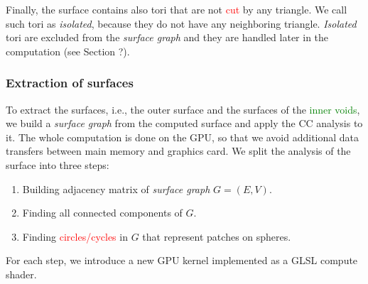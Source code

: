 Finally, the surface contains also tori that are not \textcolor{red}{cut} by any triangle.
We call such tori as \textit{isolated}, because they do not have any neighboring triangle.
\textit{Isolated} tori are excluded from the \textit{surface graph} and they are handled later in the computation (see Section ?).

\subsubsection{Extraction of surfaces}

To extract the surfaces, i.e., the outer surface and the surfaces of the \textcolor{green}{inner voids}, we build a \textit{surface graph} from the computed surface and apply the CC analysis to it.
The whole computation is done on the GPU, so that we avoid additional data transfers between main memory and graphics card.
We split the analysis of the surface into three steps:
\begin{enumerate}
  \item Building adjacency matrix of \textit{surface graph} $G = (E, V)$.
	\item Finding all connected components of $G$.
	\item Finding \textcolor{red}{circles/cycles} in $G$ that represent patches on spheres.
\end{enumerate}
For each step, we introduce a new GPU kernel implemented as a GLSL compute shader.

